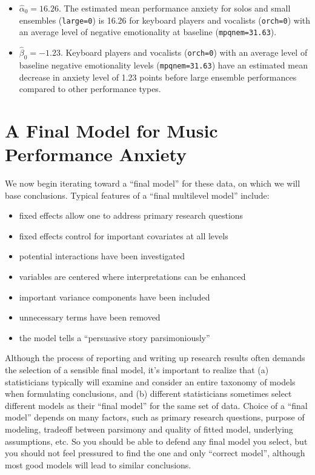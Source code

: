 \documentclass[
]{krantz}
\providecommand{\tightlist}{%
  \setlength{\itemsep}{0pt}\setlength{\parskip}{0pt}}
\begin{document}
\begin{itemize}
\tightlist
\item
  \(\hat{\alpha}_{0} = 16.26\). The estimated mean performance anxiety for solos and small ensembles (\texttt{large=0}) is 16.26 for keyboard players and vocalists (\texttt{orch=0}) with an average level of negative emotionality at baseline (\texttt{mpqnem=31.63}).
\item
  \(\hat{\beta}_{0} = -1.23\). Keyboard players and vocalists (\texttt{orch=0}) with an average level of baseline negative emotionality levels (\texttt{mpqnem=31.63}) have an estimated mean decrease in anxiety level of 1.23 points before large ensemble performances compared to other performance types.
\end{itemize}

\section{A Final Model for Music Performance Anxiety}\label{modelf}

We now begin iterating toward a ``final model'' for these data, on which we will base conclusions. Typical features of a ``final multilevel model''  include:

\begin{itemize}
\tightlist
\item
  fixed effects allow one to address primary research questions
\item
  fixed effects control for important covariates at all levels
\item
  potential interactions have been investigated
\item
  variables are centered where interpretations can be enhanced
\item
  important variance components have been included
\item
  unnecessary terms have been removed
\item
  the model tells a ``persuasive story parsimoniously''
\end{itemize}

Although the process of reporting and writing up research results often demands the selection of a sensible final model, it's important to realize that (a) statisticians typically will examine and consider an entire taxonomy of models when formulating conclusions, and (b) different statisticians sometimes select different models as their ``final model'' for the same set of data. Choice of a ``final model'' depends on many factors, such as primary research questions, purpose of modeling, tradeoff between parsimony and quality of fitted model, underlying assumptions, etc. So you should be able to defend any final model you select, but you should not feel pressured to find the one and only ``correct model'', although most good models will lead to similar conclusions.
\end{document}

